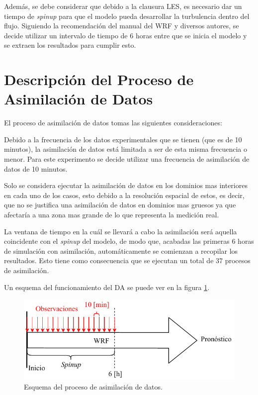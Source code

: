 Además, se debe considerar que debido a la clausura LES, es necesario dar un tiempo de \emph{spinup} para que el modelo pueda desarrollar la turbulencia dentro del flujo. Siguiendo la recomendación del manual del WRF y diversos autores, se decide utilizar un intervalo de tiempo de 6 horas entre que se inicia el modelo y se extraen los resultados para cumplir esto.

\newpage
\section{Descripción del Proceso de Asimilación de Datos}
El proceso de asimilación de datos tomas las siguientes consideraciones:
\begin{itemize*}
	\item Debido a la frecuencia de los datos experimentales que se tienen (que es de 10 minutos), la asimilación de datos está limitada a ser de esta misma frecuencia o menor. Para este experimento se decide utilizar una frecuencia de asimilación de datos de 10 minutos.
	\item Solo se considera ejecutar la asimilación de datos en los dominios mas interiores en cada uno de los casos, esto debido a la resolución espacial de estos, es decir, que no se justifica una asimilación de datos en dominios mas gruesos ya que afectaría a una zona mas grande de lo que representa la medición real.
	\item La ventana de tiempo en la cuál se llevará a cabo la asimilación será aquella coincidente con el \emph{spinup} del modelo, de modo que, acabadas las primeras 6 horas de simulación con asimilación, automáticamente se comienzan a recopilar los resultados. Esto tiene como consecuencia que se ejecutan un total de 37 procesos de asimilación.
\end{itemize*}
Un esquema del funcionamiento del DA se puede ver en la figura \ref{fig:05_da}.

\begin{figure}[H]
	\centering
		\includegraphics[width=0.95\linewidth,page=1,trim={0cm 0cm 0cm 0cm},clip]{Imagenes/05/da}%
	\caption{Esquema del proceso de asimilación de datos.}
	\label{fig:05_da}
\end{figure}

